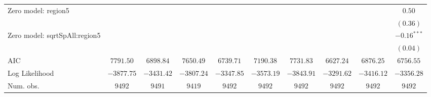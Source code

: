 \begin{center}
\begin{longtable}{l c c c c c c c c c}
Zero model: region5            &               &               &               &               &                 &                 &               &                & $0.50$        \\
                               &               &               &               &               &                 &                 &               &                & $(0.36)$      \\
Zero model: sqrtSpAll:region5  &               &               &               &               &                 &                 &               &                & $-0.16^{***}$ \\
                               &               &               &               &               &                 &                 &               &                & $(0.04)$      \\
\midrule
AIC                            & $7791.50$     & $6898.84$     & $7650.49$     & $6739.71$     & $7190.38$       & $7731.83$       & $6627.24$     & $6876.25$      & $6756.55$     \\
Log Likelihood                 & $-3877.75$    & $-3431.42$    & $-3807.24$    & $-3347.85$    & $-3573.19$      & $-3843.91$      & $-3291.62$    & $-3416.12$     & $-3356.28$    \\
Num. obs.                      & $9492$        & $9491$        & $9419$        & $9492$        & $9492$          & $9492$          & $9492$        & $9492$         & $9492$        \\
\end{longtable}
\end{center}
